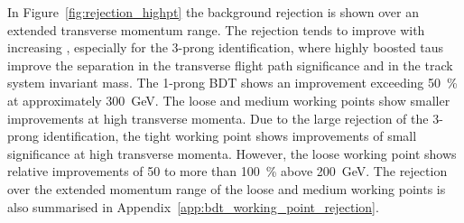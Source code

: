 In Figure~\ref{fig:rejection_highpt} the background rejection is shown over an
extended transverse momentum range. The rejection tends to improve with
increasing \tauhadvis \pt, especially for the 3-prong identification, where
highly boosted taus improve the separation in the transverse flight path
significance and in the track system invariant mass. The 1-prong BDT shows an
improvement exceeding \SI{50}{\percent} at approximately \SI{300}{\GeV}. The
loose and medium working points show smaller improvements at high transverse
momenta. Due to the large rejection of the 3-prong identification, the tight
working point shows improvements of small significance at high transverse
momenta. However, the loose working point shows relative improvements of
\num{50} to more than \SI{100}{\percent} above \SI{200}{\GeV}. The rejection
over the extended momentum range of the loose and medium working points is also
summarised in Appendix~\ref{app:bdt_working_point_rejection}.

